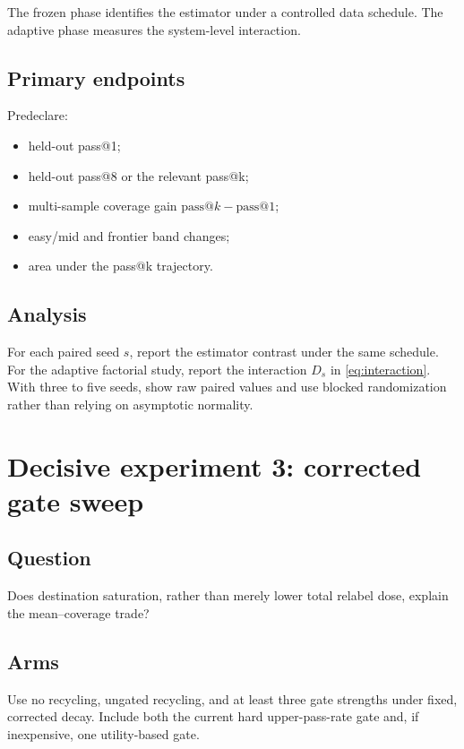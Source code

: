 \documentclass[11pt]{article}
\makeatletter
\newcommand{\PassAt}[1]{\mathrm{pass@}#1}
\theoremstyle{definition}
\theoremstyle{remark}
\makeatother
\begin{document}
The frozen phase identifies the estimator under a controlled data schedule. The adaptive phase measures the system-level interaction.

\subsection{Primary endpoints}

Predeclare:

\begin{itemize}[leftmargin=2em]
\item held-out pass@1;
\item held-out pass@8 or the relevant pass@k;
\item multi-sample coverage gain $\PassAt{k}-\PassAt{1}$;
\item easy/mid and frontier band changes;
\item area under the pass@k trajectory.
\end{itemize}

\subsection{Analysis}

For each paired seed $s$, report the estimator contrast under the same schedule. For the adaptive factorial study, report the interaction $D_s$ in \cref{eq:interaction}. With three to five seeds, show raw paired values and use blocked randomization rather than relying on asymptotic normality.

\section{Decisive experiment 3: corrected gate sweep}

\subsection{Question}

Does destination saturation, rather than merely lower total relabel dose, explain the mean--coverage trade?

\subsection{Arms}

Use no recycling, ungated recycling, and at least three gate strengths under fixed, corrected decay. Include both the current hard upper-pass-rate gate and, if inexpensive, one utility-based gate.
\end{document}
